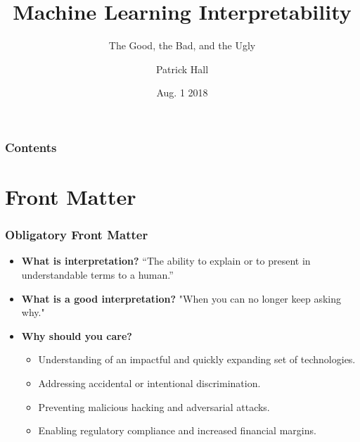 \documentclass[11pt, 
               aspectratio=169
               ]{beamer}
\author{Patrick Hall}
\title{Machine Learning Interpretability}
\subtitle{The Good, the Bad, and the Ugly}
\institute{\href{https://www.h2o.ai}{H\textsubscript{2}O.ai}}
\date{Aug. 1 2018}
\begin{document}
	
	\maketitle
	
	\begin{frame}
	
		\frametitle{Contents}
		
		\tableofcontents{}
		
	\end{frame}

	\section{Front Matter}
	
		\begin{frame}
		
			\frametitle{Obligatory Front Matter}
			
				\begin{itemize}
					
					\item \textbf{What is interpretation?} “The	ability	to explain or to present in understandable terms to	a human.” \cite{been_kim1}
					
					\item \textbf{What is a good interpretation?} "When you can no longer keep asking why." \cite{gilpin2018explaining}
					
					\item \textbf{Why should you care?}
					\begin{itemize}
						\item Understanding of an impactful and quickly expanding set of technologies. 
						\item Addressing accidental or intentional discrimination.
						\item Preventing malicious hacking and adversarial attacks.
						\item Enabling regulatory compliance and increased financial margins.
					\end{itemize}
					
				\end{itemize}
			
		\end{frame}

\end{document}
